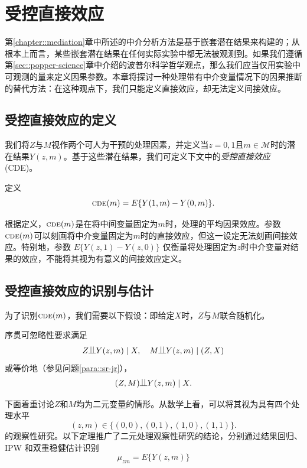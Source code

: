  
\chapter{受控直接效应}
 \label{chapter::cde}


第\ref{chapter::mediation}章中所述的中介分析方法是基于嵌套潜在结果来构建的；从根本上而言，某些嵌套潜在结果在任何实际实验中都无法被观测到。如果我们遵循第\ref{sec::popper-science}章中介绍的波普尔科学哲学观点，那么我们应当仅用实验中可观测的量来定义因果参数。本章将探讨一种处理带有中介变量情况下的因果推断的替代方法：在这种观点下，我们只能定义直接效应，却无法定义间接效应。 





\section{受控直接效应的定义}


我们将$Z$与$M$视作两个可人为干预的处理因素，并定义当$z=0,1$且$m\in \mathcal{M}$时的潜在结果$Y(z,m)$。基于这些潜在结果，我们可定义下文中的{\it 受控直接效应}(CDE)。

\begin{definition}
[CDE]
定义
$$
\textsc{cde} (m)  = E\{  Y(1,m)  - Y(0,m)\}.
$$
\end{definition}
  
 
根据定义，$\textsc{cde} (m) $是在将中间变量固定为$m$时，处理的平均因果效应。参数$\textsc{cde}(m)$可以刻画将中介变量固定为$m$时的直接效应，但这一设定无法刻画间接效应。特别地，参数
$
E\{  Y(z,1) - Y(z,0)\}
$
仅衡量将处理固定为$z$时中介变量对结果的效应，不能将其视为有意义的间接效应定义。



\section{受控直接效应的识别与估计}


为了识别$\textsc{cde}(m)$，我们需要以下假设：即给定$X$时，$Z$与$M$联合随机化。


\begin{assumption}\label{assume::si-cde}
序贯可忽略性要求满足
$$
Z\ind Y(z,m) \mid X, \quad M \ind  Y(z,m) \mid (Z,X)
$$
或等价地（参见问题\ref{para::sr-jr}），
$$
(Z,M) \ind  Y(z,m) \mid X.
$$
\end{assumption}

下面着重讨论$Z$和$M$均为二元变量的情形。从数学上看，可以将其视为具有四个处理水平
$$
(z,m) \in \{  (0,0), (0,1), (1,0), (1,1) \} .
$$
的观察性研究。以下定理推广了二元处理观察性研究的结论，分别通过结果回归、IPW 和双重稳健估计识别
$$
\mu_{zm} = E\{  Y(z,m) \}
$$ 


